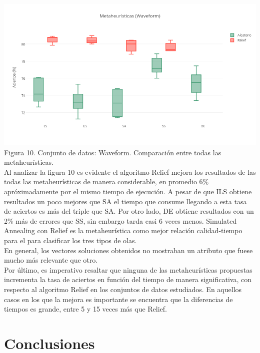 \documentclass{ci5652}
\begin{document}
\includegraphics[width=\columnwidth]{metaheuristicas_Waveform}
{\small Figura 10. Conjunto de datos: Waveform. Comparación entre todas las
metaheurísticas.}\\

Al analizar la figura 10 es evidente el algoritmo Relief mejora los resultados
de las todas las metaheurísticas de manera considerable, en promedio 6\%
apróximadamente por el mismo tiempo de ejecución. A pesar de que ILS obtiene
resultados un poco mejores que SA el tiempo que consume llegando a esta tasa de
aciertos es más del triple que SA. Por otro lado, DE obtiene resultados con un
2\% más de errores que SS, sin embargo tarda casi 6 veces menos. Simulated
Annealing con Relief es la metaheurística como mejor relación calidad-tiempo
para el para clasificar los tres tipos de olas.\\

En general, los vectores soluciones obtenidos no mostraban un atributo que fuese
mucho más relevante que otro.\\

Por último, es imperativo resaltar que ninguna de las metaheurísticas propuestas
incrementa la tasa de aciertos en función del tiempo de manera significativa,
con respecto al algoritmo Relief en los conjuntos de datos estudiados. En
aquellos casos en los que la mejora es importante se encuentra que la
diferencias de tiempos es grande, entre 5 y 15 veces más que Relief.


\section*{Conclusiones}
\end{document}
